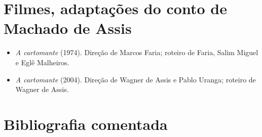 \section{Filmes, adaptações do conto de Machado de Assis}

\begin{itemize}
\item\emph{A cartomante} (1974). Direção de Marcos Faria; roteiro de Faria,
Salim Miguel e Eglê Malheiros.

\item\emph{A cartomante} (2004). Direção de Wagner de Assis e Pablo Uranga;
roteiro de Wagner de Assis.
\end{itemize}

\section{Bibliografia comentada}

